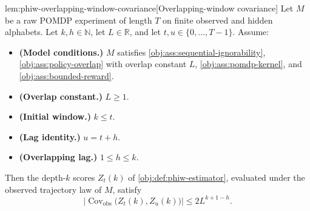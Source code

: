\documentclass[11pt]{article}
\begin{document}
\begin{lemmav}{lem:phiw-overlapping-window-covariance}[Overlapping-window covariance]
Let \(M\) be a raw POMDP experiment of length \(T\) on finite observed and hidden alphabets. Let \(k,h\in\mathbb N\), let \(L\in\mathbb R\), and let \(t,u\in\{0,\ldots,T-1\}\). Assume:
\begin{itemize}
\item \textbf{(Model conditions.)} \(M\) satisfies \cref{obj:ass:sequential-ignorability}, \cref{obj:ass:policy-overlap} with overlap constant \(L\), \cref{obj:ass:pomdp-kernel}, and \cref{obj:ass:bounded-reward}.
\item \textbf{(Overlap constant.)} \(L\ge 1\).
\item \textbf{(Initial window.)} \(k\le t\).
\item \textbf{(Lag identity.)} \(u=t+h\).
\item \textbf{(Overlapping lag.)} \(1\le h\le k\).
\end{itemize}
Then the depth-\(k\) scores \(Z_t(k)\) of \cref{obj:def:phiw-estimator}, evaluated under the observed trajectory law of \(M\), satisfy
\[
\bigl|\operatorname{Cov}_{\mathrm{obs}}\bigl(Z_t(k),Z_u(k)\bigr)\bigr|
\le
2L^{k+1-h}.
\]
\end{lemmav}
\end{document}
